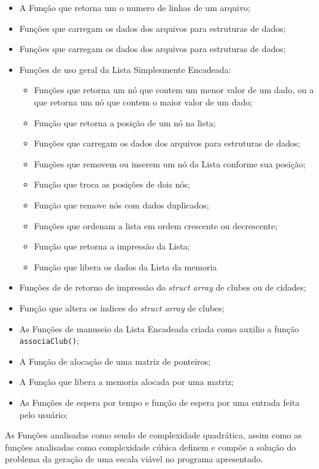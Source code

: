 \documentclass[12pt,a4paper]{article}
\numberwithin{figure}{section}
\numberwithin{table}{section}
\begin{document}
\begin{itemize}
	\setlength\itemsep{1pt}
	\item A Função que retorna um o numero de linhas de um arquivo;
	\item Funções que carregam os dados dos arquivos para estruturas de dados;
	\item Funções que carregam os dados dos arquivos para estruturas de dados;
	\item Funções de uso geral da Lista Simplesmente Encadeada:
	\begin{itemize}
		\setlength\itemsep{1pt}
		\item Funções que retorna um nó que contem um menor valor de um dado, ou a que retorna um nó que contem o maior valor de um dado;
		\item Função que retorna a posição de um nó na lista;
		\item Funções que carregam os dados dos arquivos para estruturas de dados;
		\item Funções que removem ou inserem um nó da Lista conforme sua posição;
		\item Função que troca as posições de dois nós;
		\item Função que remove nós com dados duplicados;
		\item Funções que ordenam a lista em ordem crescente ou decrescente;
		\item Função que retorna a impressão da Lista;
		\item Função que libera os dados da Lista da memoria
	\end{itemize}
	\item Funções de de retorno de impressão do \textit{struct array} de clubes ou de cidades;
	\item Função que altera os índices do \textit{struct array} de clubes;
	\item As Funções de manuseio da Lista Encadeada criada como auxilio a função\\ \texttt{associaClub()};
	\item A Função de alocação de uma matriz de ponteiros;
	\item A Função que libera a memoria alocada por uma matriz;
	\item As Funções de espera por tempo e função de espera por uma entrada feita pelo usuário;
\end{itemize}

As Funções analisadas como sendo de complexidade quadrática, assim como as funções analisadas como complexidade cúbica definem e compõe a solução do problema da geração de uma escala viável no programa apresentado. 
\end{document}
